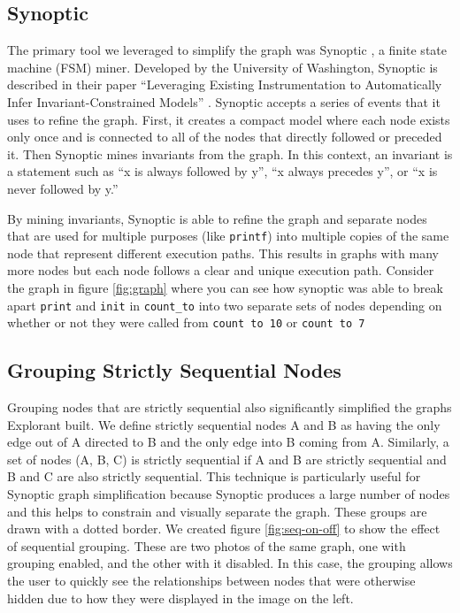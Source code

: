 \subsection{Synoptic}
\label{sec:synoptic}
The primary tool we leveraged to simplify the graph was Synoptic \cite{synoptic-site}, a finite state machine (FSM) miner. Developed by the University of Washington, Synoptic is described in their paper ``Leveraging Existing Instrumentation to Automatically Infer Invariant-Constrained Models'' \cite{synoptic}. Synoptic accepts a series of events that it uses to refine the graph. First, it creates a compact model where each node exists only once and is connected to all of the nodes that directly followed or preceded it. Then Synoptic mines invariants from the graph. In this context, an invariant is a statement such as ``x is always followed by y'', ``x always precedes y'', or ``x is never followed by y.''

By mining invariants, Synoptic is able to refine the graph and separate nodes that are used for multiple purposes (like \texttt{printf}) into multiple copies of the same node that represent different execution paths. This results in graphs with many more nodes but each node follows a clear and unique execution path. Consider the graph in figure \ref{fig:graph} where you can see how synoptic was able to break apart \texttt{print} and \texttt{init} in \texttt{count\_to} into two separate sets of nodes depending on whether or not they were called from \texttt{count to 10} or \texttt{count to 7}

\subsection{Grouping Strictly Sequential Nodes}
Grouping nodes that are strictly sequential also significantly simplified the graphs Explorant built. We define strictly sequential nodes A and B as having the only edge out of A directed to B and the only edge into B coming from A. Similarly, a set of nodes (A, B, C) is strictly sequential if A and B are strictly sequential and B and C are also strictly sequential. This technique is particularly useful for Synoptic graph simplification because Synoptic produces a large number of nodes and this helps to constrain and visually separate the graph. These groups are drawn with a dotted border. We created figure \ref{fig:seq-on-off} to show the effect of sequential grouping. These are two photos of the same graph, one with grouping enabled, and the other with it disabled. In this case, the grouping allows the user to quickly see the relationships between nodes that were otherwise hidden due to how they were displayed in the image on the left.

